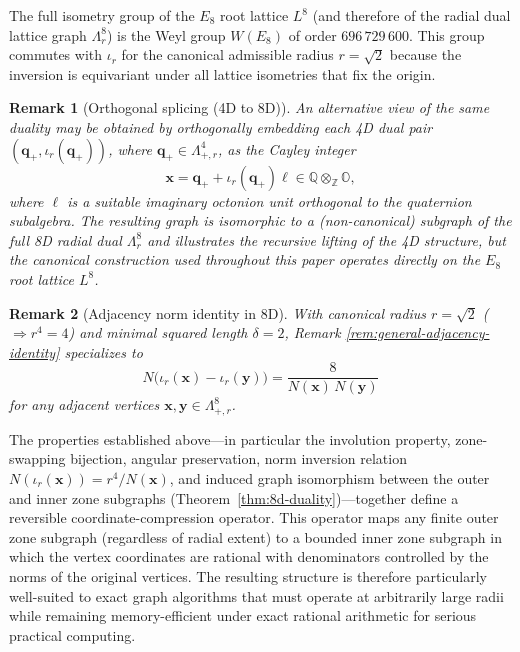 \documentclass{article}
\newtheorem{remark}{Remark}
\begin{document}
The full isometry group of the $E_8$ root lattice \(L^8\) (and therefore of the radial dual lattice graph \(\Lambda_r^8\)) is the Weyl group \(W(E_8)\) of order $696\,729\,600$. This group commutes with \(\iota_r\) for the canonical admissible radius \(r=\sqrt{2}\) because the inversion is equivariant under all lattice isometries that fix the origin.

\begin{remark}[Orthogonal splicing (4D to 8D)]
\label{rem:orthogonal-splicing-4d-8d}
An alternative view of the same duality may be obtained by orthogonally embedding each 4D dual pair \((\mathbf{q}_+,\iota_r(\mathbf{q}_+))\), where \(\mathbf{q}_+ \in \Lambda_{+,r}^4\), as the Cayley integer
\[
\mathbf{x} = \mathbf{q}_+ + \iota_r(\mathbf{q}_+) \ell \in \mathbb{Q} \otimes_{\mathbb{Z}} \mathbb{O},
\]
where \(\ell\) is a suitable imaginary octonion unit orthogonal to the quaternion subalgebra. The resulting graph is isomorphic to a (non-canonical) subgraph of the full 8D radial dual \(\Lambda_r^8\) and illustrates the recursive lifting of the 4D structure, but the canonical construction used throughout this paper operates directly on the $E_8$ root lattice \(L^8\).
\end{remark}

\begin{remark}[Adjacency norm identity in 8D]
\label{rem:adj-norm-identity-8d}
With canonical radius $r=\sqrt{2}$ ($\Rightarrow r^4=4$) and minimal squared length $\delta=2$, Remark \ref{rem:general-adjacency-identity} specializes to
\[
N\bigl(\iota_r(\mathbf{x}) - \iota_r(\mathbf{y})\bigr) = \frac{8}{N(\mathbf{x})\,N(\mathbf{y})}
\]
for any adjacent vertices $\mathbf{x},\mathbf{y} \in \Lambda_{+,r}^8$.
\end{remark}

The properties established above---in particular the involution property, zone-swapping bijection, angular preservation, norm inversion relation $N(\iota_r(\mathbf{x})) = r^4 / N(\mathbf{x})$, and induced graph isomorphism between the outer and inner zone subgraphs (Theorem~\ref{thm:8d-duality})---together define a reversible coordinate-compression operator. This operator maps any finite outer zone subgraph (regardless of radial extent) to a bounded inner zone subgraph in which the vertex coordinates are rational with denominators controlled by the norms of the original vertices. The resulting structure is therefore particularly well-suited to exact graph algorithms that must operate at arbitrarily large radii while remaining memory-efficient under exact rational arithmetic for serious practical computing.
\end{document}
